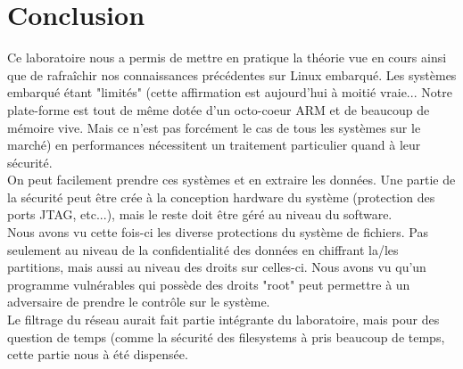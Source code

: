 
\chapter{Conclusion} %

\label{Conclusion} %



Ce laboratoire nous a permis de mettre en pratique la théorie vue en cours ainsi que de rafraîchir nos connaissances précédentes sur Linux embarqué. Les systèmes embarqué étant "limités" (cette affirmation est aujourd'hui à moitié vraie... Notre plate-forme est tout de même dotée d'un octo-coeur ARM et de beaucoup de mémoire vive. Mais ce n'est pas forcément le cas de tous les systèmes sur le marché) en performances nécessitent un traitement particulier quand à leur sécurité.\\ 

On peut facilement prendre ces systèmes et en extraire les données. Une partie de la sécurité peut être crée à la conception hardware du système (protection des ports JTAG, etc...), mais le reste doit être géré au niveau du software. \\

Nous avons vu cette fois-ci les diverse protections du système de fichiers. Pas seulement au niveau de la confidentialité des données en chiffrant la/les partitions, mais aussi au niveau des droits sur celles-ci. Nous avons vu qu'un programme vulnérables qui possède des droits "root" peut permettre à un adversaire de prendre le contrôle sur le système.\\

Le filtrage du réseau aurait fait partie intégrante du laboratoire, mais pour des question de temps (comme la sécurité des filesystems à pris beaucoup de temps, cette partie nous à été dispensée.

